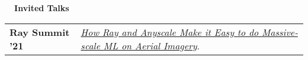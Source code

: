 \documentclass[a4paper,12pt]{article}
\newcommand{\resheading}[1]{{\vspace*{.001in} \colorbox{mygrey}{\begin{minipage}{\textwidth}{\textmd{\large \textbf{#1} \vphantom{p\^{E}}}}\end{minipage}}} }
\newcommand{\tabitem}{~~\llap{\textbullet}~~}
\begin{document}
    \resheading{~~Invited Talks}
    \vspace{-1.5em}

    \begin{tabularx}{\textwidth}{p{3cm}>{\arraybackslash}X}  %

        \bfseries{Ray Summit '21} & \href{https://www.anyscale.com/events/2021/06/22/how-ray-and-anyscale-make-it-easy-to-do-massive-scale-ml-on-aerial-imagery}{\textit{How Ray and Anyscale Make it Easy to do Massive-scale ML on Aerial Imagery}}.\\
    \end{tabularx}






\end{document}
